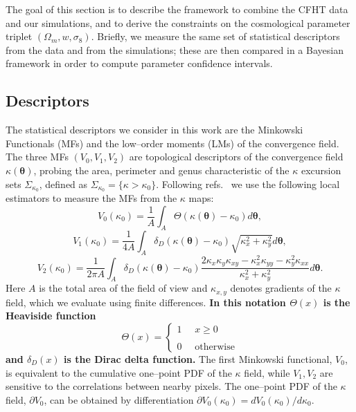 \documentclass[reprint,aps,prd,superscriptaddress,showkeys,showpacs]{revtex4-1}
\begin{document}
The goal of this section is to describe the framework to combine the
CFHT data and our simulations, and to derive the constraints on the
cosmological parameter triplet $(\Omega_m,w,\sigma_8)$. Briefly, we
measure the same set of statistical descriptors from the data and from the
simulations; these are then compared in a Bayesian framework in
order to compute parameter confidence intervals.

\subsection{Descriptors}

The statistical descriptors we consider in this work are the Minkowski
Functionals (MFs) and the low--order moments (LMs) of the convergence
field. The three MFs $(V_0,V_1,V_2)$ are topological descriptors of
the convergence field $\kappa(\pmb{\theta})$, probing the area,
perimeter and genus characteristic of the $\kappa$ excursion sets
$\Sigma_{\kappa_0}$, defined as
$\Sigma_{\kappa_0}=\{\kappa>\kappa_0\}$. Following
refs.~\citep{Petri2013,MinkJan} we use the following local estimators
to measure the MFs from the $\kappa$ maps:
\begin{equation*}
\label{v0meas}
V_0(\kappa_0)=\frac{1}{A}\int_A\Theta(\kappa(\pmb{\theta})-\kappa_0)d\pmb{\theta},
\end{equation*}
\begin{equation}
\label{v1meas}
V_1(\kappa_0)=\frac{1}{4A}\int_A\delta_D(\kappa(\pmb{\theta})-\kappa_0)\sqrt{\kappa_x^2+\kappa_y^2}d\pmb{\theta},
\end{equation}
\begin{equation*}
\label{v2meas}
V_2(\kappa_0)=\frac{1}{2\pi A}\int_A\delta_D(\kappa(\pmb{\theta})-\kappa_0)\frac{2\kappa_x\kappa_y\kappa_{xy}-\kappa_x^2\kappa_{yy}-\kappa_y^2\kappa_{xx}}{\kappa_x^2+\kappa_y^2}d\pmb{\theta}.
\end{equation*}
Here $A$ is the total area of the field of view and $\kappa_{x,y}$
denotes gradients of the $\kappa$ field, which we evaluate using
finite differences. \textbf{In this notation $\Theta(x)$ is the Heaviside function}
%
\begin{equation}
\Theta(x) = 
\begin{cases}
1 \,\,\,\,\,\,\,\, x\geq0 \\ \\
0 \,\,\,\,\,\,\,\, \mathrm{otherwise}
\end{cases}
\end{equation}
%
\textbf{and $\delta_D(x)$ is the Dirac delta function.}
The first Minkowski functional, $V_0$, is
equivalent to the cumulative one--point PDF of the $\kappa$ field,
while $V_1,V_2$ are sensitive to the correlations between nearby
pixels. The one--point PDF of the $\kappa$ field, $\partial V_0$, can
be obtained by differentiation $\partial
V_0(\kappa_0)=dV_0(\kappa_0)/d\kappa_0$. 
\end{document}
